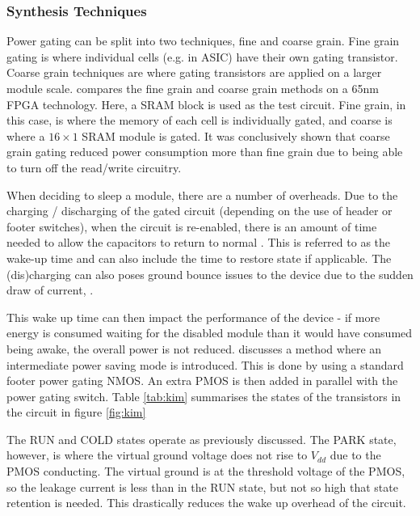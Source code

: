 \subsubsection{Synthesis Techniques}

Power gating can be split into two techniques, fine and coarse grain.
Fine grain gating is where individual cells (e.g. in ASIC) have their own gating transistor. 
Coarse grain techniques are where gating transistors are applied on a larger module scale.
\cite{nair2009comparative} compares the fine grain and coarse grain methods on a 65nm FPGA technology. 
Here, a SRAM block is used as the test circuit. 
Fine grain, in this case, is where the memory of each cell is individually gated, and coarse is where a $16 \times 1$ SRAM module is gated. 
It was conclusively shown that coarse grain gating reduced power consumption more than fine grain due to being able to turn off the read/write circuitry. 


When deciding to sleep a module, there are a number of overheads.
Due to the charging / discharging of the gated circuit (depending on the use of header or footer switches), when the circuit is re-enabled, there is an amount of time needed to allow the capacitors to return to normal \cite{abdollahi2005effective}.
This is referred to as the wake-up time and can also include the time to restore state if applicable.
The (dis)charging can also poses ground bounce issues to the device due to the sudden draw of current, \cite{kim2003understanding,chang1997analysis}. 

This wake up time can then impact the performance of the device - if more energy is consumed waiting for the disabled module than it would have consumed being awake, the overall power is not reduced.
\cite{kim2004experimental} discusses a method where an intermediate power saving mode is introduced.
This is done by using a standard footer power gating NMOS. 
An extra PMOS is then added in parallel with the power gating switch. 
Table \ref{tab:kim} summarises the states of the transistors in the circuit in figure \ref{fig:kim}

The RUN and COLD states operate as previously discussed. 
The PARK state, however, is where the virtual ground voltage does not rise to $V_{dd}$ due to the PMOS conducting. 
The virtual ground is at the threshold voltage of the PMOS, so the leakage current is less than in the RUN state, but not so high that state retention is needed. 
This drastically reduces the wake up overhead of the circuit. 


